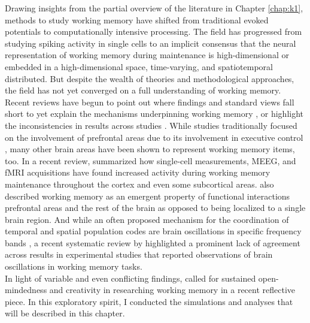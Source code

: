 Drawing insights from the partial overview of the literature in Chapter \ref{chap:k1}, methods to study working memory have shifted from traditional evoked potentials to computationally intensive processing.
The field has progressed from studying spiking activity in single cells to an implicit consensus that the neural representation of working memory during maintenance is high-dimensional or embedded in a high-dimensional space, time-varying, and spatiotemporal distributed.
But despite the wealth of theories and methodological approaches, the field has not yet converged on a full understanding of working memory.
Recent reviews have begun to point out where findings and standard views fall short to yet explain the mechanisms underpinning working memory \citep{nobre2022opening}, or highlight the inconsistencies in results across studies \citep{pavlov2022oscillatory}.
While studies traditionally focused on the involvement of prefrontal areas due to its involvement in executive control \citep[e.g.,][]{fuster1971neuron, funahashi1989mnemonic, miller1996neural}, many other brain areas have been shown to represent working memory items, too.
In a recent review, \citet{sreenivasan2019and} summarized how single-cell measurements, MEEG, and \gls{fMRI} acquisitions have found increased activity during working memory maintenance throughout the cortex and even some subcortical areas.
\citet{d2007cognitive} also described working memory as an emergent property of functional interactions prefrontal areas and the rest of the brain as opposed to being localized to a single brain region.
And while an often proposed mechanism for the coordination of temporal and spatial population codes are brain oscillations in specific frequency bands \citet[e.g.,][]{roux2014working}, %
a recent systematic review by \citet{pavlov2022oscillatory} highlighted a prominent lack of agreement across results in experimental studies that reported observations of brain oscillations in working memory tasks.\\
In light of variable and even conflicting findings, \citet{nobre2022opening} called for sustained open-mindedness and creativity in researching working memory in a recent reflective piece.
In this exploratory spirit, I conducted the simulations and analyses that will be described in this chapter.
